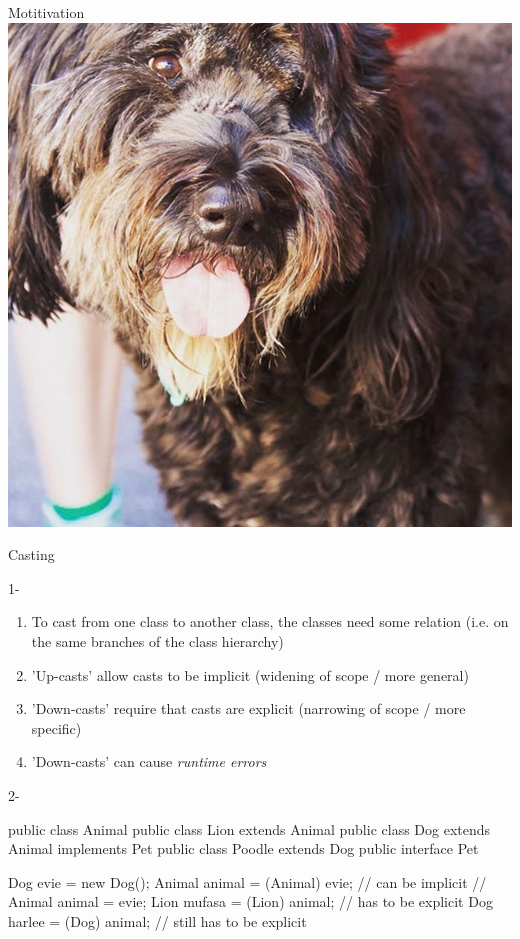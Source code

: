 \documentclass[week3]{csse2002}
\begin{document}
\begin{topic}{Motitivation}
\includegraphics[width=\textwidth,keepaspectratio]{doggo.jpg}
\end{topic}

\begin{topic}{Casting}
\begin{subtopic}{1-}
\begin{enumerate}
	\item To cast from one class to another class, the classes need some relation (i.e. on the same branches of the class hierarchy)
	\item 'Up-casts' allow casts to be implicit (widening of scope / more general)
	\item 'Down-casts' require that casts are explicit (narrowing of scope / more specific)
	\item 'Down-casts' can cause \emph{runtime errors}
\end{enumerate}
\end{subtopic}

\begin{subtopic}{2-}
\begin{java}
public class Animal {}
public class Lion extends Animal {}
public class Dog extends Animal implements Pet {}
public class Poodle extends Dog {}
public interface Pet {}

Dog evie = new Dog();
Animal animal = (Animal) evie; // can be implicit
// Animal animal = evie;
Lion mufasa = (Lion) animal; // has to be explicit
Dog harlee = (Dog) animal; // still has to be explicit
\end{java}
\end{subtopic}
\end{topic}
\end{document}
